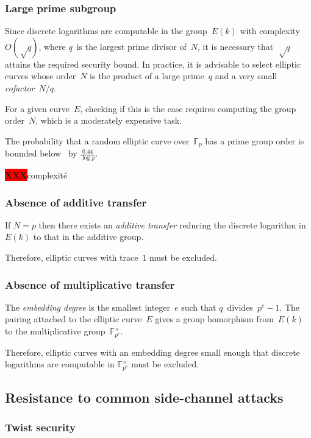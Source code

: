 \documentclass{article}
\def\F{\mathbb{F}}
\def\XXX{{\colorbox{red}{{\color{white}\bfseries XXX}}}}
\begin{document}
\subsubsection{Large prime subgroup}

Since discrete logarithms are computable in the group~$E(k)$
with complexity~$O(√q)$, where $q$~is the largest prime divisor of~$N$,
it is necessary that~$√q$ attains the required security bound.
In practice, it is advisable to select elliptic curves whose order~$N$
is the product of a large prime~$q$
and a very small \emph{cofactor}~$N/q$.

For a given curve~$E$, checking if this is the case
requires computing the group order~$N$,
which is a moderately expensive task.

The probability that a random elliptic curve over~$\F_p$
has a prime group order is bounded below~\cite{lms2000gm}
by $\frac{0.44}{\log p}$.

\XXX complexité

\subsubsection{Absence of additive transfer}

If $N = p$ then there exists an \emph{additive transfer}
reducing the discrete logarithm in~$E(k)$
to that in the additive group.

Therefore, elliptic curves with trace~$1$ must be excluded.

\subsubsection{Absence of multiplicative transfer}

The \emph{embedding degree} is the smallest integer~$e$ such that
$q$~divides~$p^e -1$.
The pairing attached to the elliptic curve~$E$
gives a group homorphism from~$E(k)$
to the multiplicative group~$\F_{p^e}^{×}$.

Therefore, elliptic curves with an embedding degree small enough
that discrete logarithms are computable in $\F_{p^e}^{×}$
must be excluded.

\subsection{Resistance to common side-channel attacks}
\label{ss:side}

\subsubsection{Twist security}
\label{sss:twist}
\end{document}
